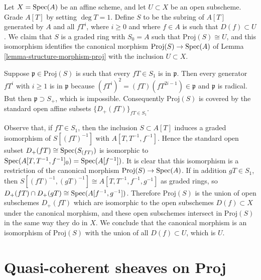 \begin{example}
\label{example-open-subset-proj}
Let $X = \mathop{\mathrm{Spec}}(A)$ be an affine scheme, and let $U \subset X$
be an open subscheme.  Grade $A[T]$ by setting $\deg T = 1$.  Define $S$
to be the subring of $A[T]$ generated by $A$ and all $fT^i$, where $i \ge 0$
and where $f \in A$ is such that $D(f) \subset U$.  We claim that $S$
is a graded ring with $S_0 = A$ such that $\text{Proj}(S) \cong U$,
and this isomorphism identifies the canonical morphism
$\text{Proj}(S) \to \mathop{\mathrm{Spec}}(A)$ of Lemma \ref{lemma-structure-morphism-proj}
with the inclusion $U \subset X$.

\medskip\noindent
Suppose $\mathfrak p \in \text{Proj}(S)$ is such that every $fT \in S_1$
is in $\mathfrak p$.  Then every generator $fT^i$ with $i \ge 1$
is in $\mathfrak p$ because $(fT^i)^2 = (fT)(fT^{2i-1}) \in \mathfrak p$
and $\mathfrak p$ is radical.  But then $\mathfrak p \supset S_+$, which
is impossible. Consequently $\text{Proj}(S)$ is covered by the standard
open affine subsets $\{D_+(fT)\}_{fT \in S_1}$.

\medskip\noindent
Observe that, if $fT \in S_1$, then the inclusion $S \subset A[T]$
induces a graded isomorphism of $S[(fT)^{-1}]$ with $A[T, T^{-1}, f^{-1}]$.
Hence the standard open subset $D_+(fT) \cong \mathop{\mathrm{Spec}}(S_{(fT)})$
is isomorphic to $\mathop{\mathrm{Spec}}(A[T, T^{-1}, f^{-1}]_0) = \mathop{\mathrm{Spec}}(A[f^{-1}])$.
It is clear that this isomorphism is a restriction of the canonical morphism
$\text{Proj}(S) \to \mathop{\mathrm{Spec}}(A)$.  If in addition $gT \in S_1$, then
$S[(fT)^{-1}, (gT)^{-1}] \cong A[T, T^{-1}, f^{-1}, g^{-1}]$
as graded rings, so $D_+(fT) \cap D_+(gT) \cong \mathop{\mathrm{Spec}}(A[f^{-1}, g^{-1}])$.
Therefore $\text{Proj}(S)$ is the union of open subschemes $D_+(fT)$
which are isomorphic to the open subschemes $D(f) \subset X$
under the canonical morphism, and these open subschemes intersect
in $\text{Proj}(S)$ in the same way they do in $X$.
We conclude that the canonical morphism is an isomorphism of
$\text{Proj}(S)$ with the union of all $D(f) \subset U$, which is $U$.
\end{example}





















\section{Quasi-coherent sheaves on Proj}
\label{section-quasi-coherent-proj}

